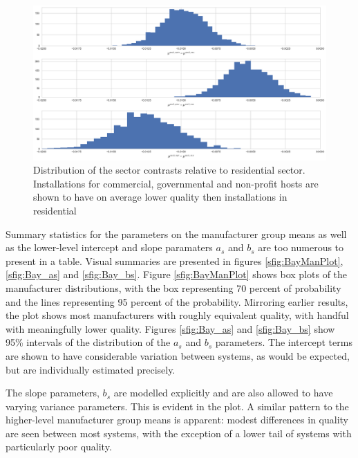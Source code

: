 \documentclass[12pt]{article}
\begin{document}
\begin{figure}
  \centering
  \includegraphics[width=.6\linewidth]{figures/mu_sectors.png}
  \caption{Distribution of the sector contrasts relative to residential sector. Installations for commercial, governmental and non-profit hosts are shown to have on average lower quality then installations in residential}
  \label{mu_sectors}
\end{figure}

Summary statistics for the parameters on the manufacturer group means as well as the lower-level intercept and slope paramaters $a_s$ and $b_s$ are too numerous to present in a table. Visual summaries are presented in figures \ref{sfig:BayManPlot}, \ref{sfig:Bay_as} and \ref{sfig:Bay_bs}. Figure \ref{sfig:BayManPlot} shows box plots of the manufacturer distributions, with the box representing 70 percent of probability and the lines representing 95 percent of the probability. Mirroring earlier results, the plot shows most manufacturers with roughly equivalent quality, with handful with meaningfully lower quality. Figures \ref{sfig:Bay_as} and \ref{sfig:Bay_bs} show 95\% intervals of the distribution of the $a_s$ and $b_s$ parameters. The intercept terms are shown to have considerable variation between systems, as would be expected, but are individually estimated precisely.

The slope parameters, $b_s$ are modelled explicitly and are also allowed to have varying variance parameters. This is evident in the plot. A similar pattern to the higher-level manufacturer group means is apparent: modest differences in quality are seen between most systems, with the exception of a lower tail of systems with particularly poor quality.
\end{document}
